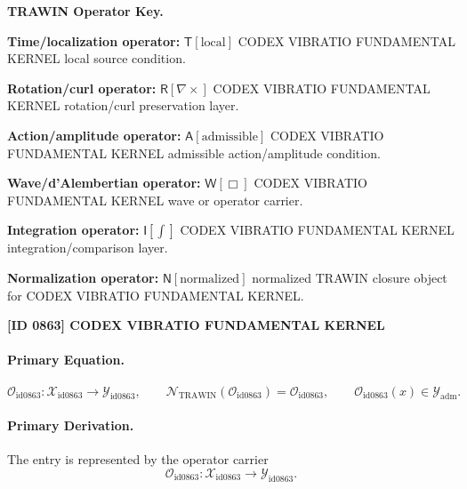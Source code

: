 \par\vspace{0.45\baselineskip}
\noindent\begin{minipage}[t]{\linewidth}
\begingroup
\small
\raggedright
\textbf{TRAWIN Operator Key.}\par
\noindent\textbf{Time/localization operator:} $\mathsf{T}\!\left[\mathrm{local}\right]$ CODEX VIBRATIO FUNDAMENTAL KERNEL local source condition.\par
\noindent\textbf{Rotation/curl operator:} $\mathsf{R}\!\left[\nabla\times\right]$ CODEX VIBRATIO FUNDAMENTAL KERNEL rotation/curl preservation layer.\par
\noindent\textbf{Action/amplitude operator:} $\mathsf{A}\!\left[\mathrm{admissible}\right]$ CODEX VIBRATIO FUNDAMENTAL KERNEL admissible action/amplitude condition.\par
\noindent\textbf{Wave/d'Alembertian operator:} $\mathsf{W}\!\left[\Box\right]$ CODEX VIBRATIO FUNDAMENTAL KERNEL wave or operator carrier.\par
\noindent\textbf{Integration operator:} $\mathsf{I}\!\left[\int\right]$ CODEX VIBRATIO FUNDAMENTAL KERNEL integration/comparison layer.\par
\noindent\textbf{Normalization operator:} $\mathsf{N}\!\left[\mathrm{normalized}\right]$ normalized TRAWIN closure object for CODEX VIBRATIO FUNDAMENTAL KERNEL.\par
\endgroup
\end{minipage}

\clearpage
\noindent\textbf{[ID 0863] CODEX VIBRATIO FUNDAMENTAL KERNEL}\par
\vspace{0.35em}
\paragraph{Primary Equation.}
\[
\mathcal{O}_{\mathrm{id0863}}:\mathcal{X}_{\mathrm{id0863}}\longrightarrow \mathcal{Y}_{\mathrm{id0863}},\qquad
\mathcal{N}_{\mathrm{TRAWIN}}(\mathcal{O}_{\mathrm{id0863}})=\mathcal{O}_{\mathrm{id0863}},\qquad
\mathcal{O}_{\mathrm{id0863}}(x)\in\mathcal{Y}_{\mathrm{adm}}.
\]

\paragraph{Primary Derivation.} The entry is represented by the operator carrier\[
\mathcal{O}_{\mathrm{id0863}}:\mathcal{X}_{\mathrm{id0863}}\longrightarrow \mathcal{Y}_{\mathrm{id0863}}.
\]

